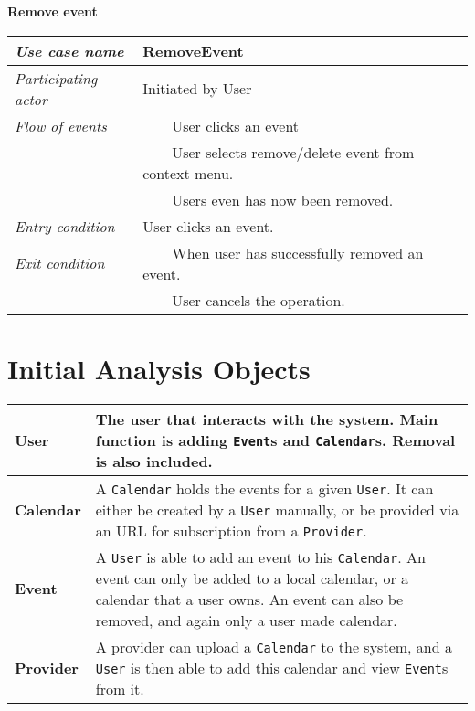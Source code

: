 \documentclass[10pt]{report}
\newcommand{\tabitem}{~~\llap{\textbullet}~~}
\numberwithin{equation}{section} %
\numberwithin{figure}{section} %
\numberwithin{table}{section} %
\begin{document}
\begin{table}[H]
\noindent \textbf{Remove event}\\
\begin{tabularx}{\textwidth}{l X}
\midrule
\textit{Use case name} & RemoveEvent \\ \midrule
\textit{Participating actor} & Initiated by User \\ \midrule
\textit{Flow of events} & \tabitem User clicks an event\\
                                       & \tabitem User selects remove/delete
                                       event from context menu.\\
                                       & \tabitem Users even has now been removed.\\
                        \midrule
\textit{Entry condition} & User clicks an event.\\ \midrule
\textit{Exit condition} & \tabitem When user has successfully removed an event. \\
						& \tabitem User cancels the operation.\\
                        \midrule
\end{tabularx}
\end{table}

\section{Initial Analysis Objects}
\begin{table}[H]
\begin{tabularx}{\textwidth}{l X}
\midrule
\textbf{User} & The user that interacts with the system. Main function is adding
  \texttt{Event}s and \texttt{Calendar}s. Removal is also included.\\ \midrule
\textbf{Calendar} & A \texttt{Calendar} holds the events for a given
  \texttt{User}. It can either be created by a \texttt{User} manually, or be
  provided via an URL for subscription from a \texttt{Provider}. \\ \midrule
\textbf{Event} & A \texttt{User} is able to add an event to his
  \texttt{Calendar}. An event can only be added to a local calendar, or a calendar
  that a user owns. An event can also be removed, and again only a user made
  calendar.\\ \midrule
\textbf{Provider} & A provider can upload a \texttt{Calendar} to the system, and
  a \texttt{User} is then able to add this calendar and view \texttt{Event}s
  from it.\\ \midrule
\end{tabularx}
\end{table}
\end{document}
